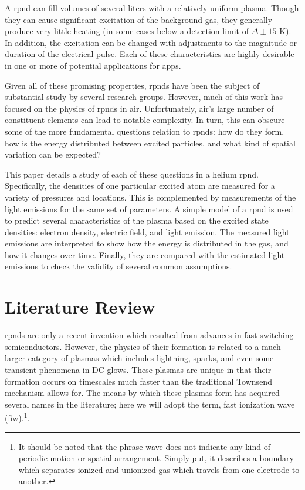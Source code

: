 A \acs{rpnd} can fill volumes of several liters with a relatively uniform
plasma. Though they can cause significant excitation of the background gas, they
generally produce very little heating (in some cases below a detection limit of
$\Delta \pm 15$ K). In addition, the excitation can be changed with adjustments
to the magnitude or duration of the electrical pulse. Each of these
characteristics are highly desirable in one or more of potential applications
for \acs{app}s.

Given all of these promising properties, \acs{rpnd}s have been the subject of
substantial study by several research groups. However, much of this work has
focused on the physics of \acs{rpnd}s in air. Unfortunately, air's large number
of constituent elements can lead to notable complexity. In turn, this can
obscure some of the more fundamental questions relation to \acs{rpnd}s: how do
they form, how is the energy distributed between excited particles, and what
kind of spatial variation can be expected?

This paper details a study of each of these questions in a helium \acs{rpnd}.
Specifically, the densities of one particular excited atom are measured for a
variety of pressures and locations. This is complemented by measurements of the
light emissions for the same set of parameters. A simple model of a \acs{rpnd}
is used to predict several characteristics of the plasma based on the excited
state densities: electron density, electric field, and light emission. The
measured light emissions are interpreted to show how the energy is distributed
in the gas, and how it changes over time. Finally, they are compared with the
estimated light emissions to check the validity of several common assumptions.

\section{Literature Review}

\acs{rpnd}s are only a recent invention which resulted from advances in
fast-switching semiconductors. However, the physics of their formation is
related to a much larger category of plasmas which includes lightning, sparks,
and even some transient phenomena in DC glows. These plasmas are unique in that
their formation occurs on timescales much faster than the traditional Townsend
mechanism allows for. The means by which these plasmas form has acquired several
names in the literature; here we will adopt the term, fast ionization wave
(\acs{fiw}).\footnote{It should be noted that the phrase wave does not indicate
any kind of periodic motion or spatial arrangement. Simply put, it describes a
boundary which separates ionized and unionized gas which travels from one
electrode to another.}.

